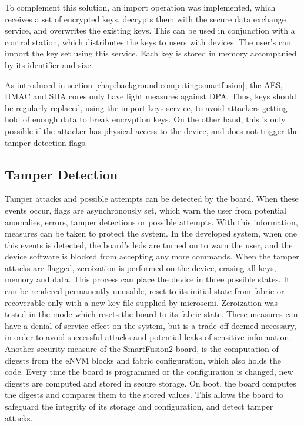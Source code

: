 To complement this solution, an import operation was implemented, which receives a set of encrypted keys, decrypts them with the secure data exchange service, and overwrites the existing keys. This can be used in conjunction with a control station, which distributes the keys to users with devices. The user's can import the key set using this service.
Each key is stored in memory accompanied by its identifier and size.

As introduced in section \ref{chap:background:computing:smartfusion}, the AES, HMAC and SHA cores only have light measures against \ac{DPA}. Thus, keys should be regularly replaced, using the import keys service, to avoid attackers getting hold of enough data to break encryption keys. On the other hand, this is only possible if the attacker has physical access to the device, and does not trigger the tamper detection flags. 

\subsection{Tamper Detection}\label{chap:implementation:services:tamper-detection}

Tamper attacks and possible attempts can be detected by the board. When these events occur, flags are asynchronously set, which warn the user from potential anomalies, errors, tamper detections or possible attempts. With this information, measures can be taken to protect the system.
In the developed system, when one this events is detected, the board's leds are turned on to warn the user, and the device software is blocked from accepting any more commands.
When the tamper attacks are flagged, zeroization is performed on the device, erasing all keys, memory and data.
This process can place the device in three possible states. It can be rendered permanently unusable, reset to its initial state from fabric or recoverable only with a new key file supplied by microsemi. Zeroization was tested in the mode which resets the board to its fabric state.
These measures can have a denial-of-service effect on the system, but is a trade-off deemed necessary, in order to avoid successful attacks and potential leaks of sensitive information.
Another security measure of the SmartFusion2 board, is the computation of digests from the eNVM blocks and fabric configuration, which also holds the code. Every time the board is programmed or the configuration is changed, new digests are computed and stored in secure storage. On boot, the board computes the digests and compares them to the stored values. This allows the board to safeguard the integrity of its storage and configuration, and detect tamper attacks.

